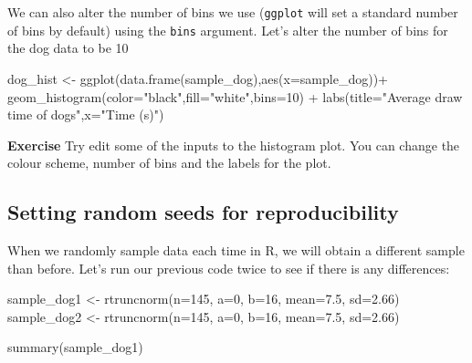 \documentclass[
]{book}
\newenvironment{Shaded}{\begin{snugshade}}{\end{snugshade}}
\newcommand{\AttributeTok}[1]{\textcolor[rgb]{0.77,0.63,0.00}{#1}}
\newcommand{\DecValTok}[1]{\textcolor[rgb]{0.00,0.00,0.81}{#1}}
\newcommand{\FloatTok}[1]{\textcolor[rgb]{0.00,0.00,0.81}{#1}}
\newcommand{\FunctionTok}[1]{\textcolor[rgb]{0.00,0.00,0.00}{#1}}
\newcommand{\NormalTok}[1]{#1}
\newcommand{\OtherTok}[1]{\textcolor[rgb]{0.56,0.35,0.01}{#1}}
\newcommand{\SpecialCharTok}[1]{\textcolor[rgb]{0.00,0.00,0.00}{#1}}
\newcommand{\StringTok}[1]{\textcolor[rgb]{0.31,0.60,0.02}{#1}}
\begin{document}
We can also alter the number of bins we use (\texttt{ggplot} will set a standard number of bins by default) using the \texttt{bins} argument. Let's alter the number of bins for the dog data to be 10

\begin{Shaded}
\begin{Highlighting}[]
\NormalTok{dog\_hist }\OtherTok{\textless{}{-}} \FunctionTok{ggplot}\NormalTok{(}\FunctionTok{data.frame}\NormalTok{(sample\_dog),}\FunctionTok{aes}\NormalTok{(}\AttributeTok{x=}\NormalTok{sample\_dog))}\SpecialCharTok{+}
  \FunctionTok{geom\_histogram}\NormalTok{(}\AttributeTok{color=}\StringTok{"black"}\NormalTok{,}\AttributeTok{fill=}\StringTok{"white"}\NormalTok{,}\AttributeTok{bins=}\DecValTok{10}\NormalTok{) }\SpecialCharTok{+} 
  \FunctionTok{labs}\NormalTok{(}\AttributeTok{title=}\StringTok{"Average draw time of dogs"}\NormalTok{,}\AttributeTok{x=}\StringTok{"Time (s)"}\NormalTok{)}
\end{Highlighting}
\end{Shaded}

\textbf{Exercise}
Try edit some of the inputs to the histogram plot. You can change the colour scheme, number of bins and the labels for the plot.

\hypertarget{setting-random-seeds-for-reproducibility}{%
\subsection{Setting random seeds for reproducibility}\label{setting-random-seeds-for-reproducibility}}

When we randomly sample data each time in R, we will obtain a different sample than before. Let's run our previous code twice to see if there is any differences:

\begin{Shaded}
\begin{Highlighting}[]
\NormalTok{sample\_dog1 }\OtherTok{\textless{}{-}} \FunctionTok{rtruncnorm}\NormalTok{(}\AttributeTok{n=}\DecValTok{145}\NormalTok{, }\AttributeTok{a=}\DecValTok{0}\NormalTok{, }\AttributeTok{b=}\DecValTok{16}\NormalTok{, }\AttributeTok{mean=}\FloatTok{7.5}\NormalTok{, }\AttributeTok{sd=}\FloatTok{2.66}\NormalTok{)}
\NormalTok{sample\_dog2 }\OtherTok{\textless{}{-}} \FunctionTok{rtruncnorm}\NormalTok{(}\AttributeTok{n=}\DecValTok{145}\NormalTok{, }\AttributeTok{a=}\DecValTok{0}\NormalTok{, }\AttributeTok{b=}\DecValTok{16}\NormalTok{, }\AttributeTok{mean=}\FloatTok{7.5}\NormalTok{, }\AttributeTok{sd=}\FloatTok{2.66}\NormalTok{)}

\FunctionTok{summary}\NormalTok{(sample\_dog1)}
\end{Highlighting}
\end{Shaded}
\end{document}

